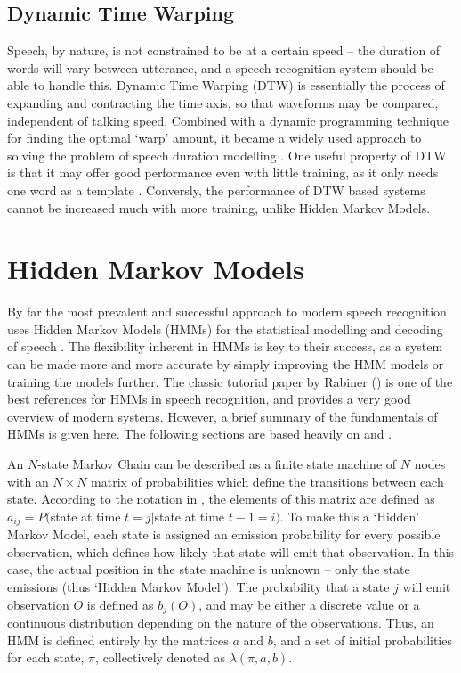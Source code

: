 	\subsection{Dynamic Time Warping} %
		\label{sub:dynamic_time_warping}
		Speech, by nature, is not constrained to be at a certain speed -- the duration of words will vary between utterance, and a speech recognition system should be able to handle this.  Dynamic Time Warping (DTW) is essentially the process of expanding and contracting the time axis, so that waveforms may be compared, independent of talking speed.  Combined with a dynamic programming technique for finding the optimal `warp' amount, it became a widely used approach to solving the problem of speech duration modelling \cite{furui1989speech}.  One useful property of DTW is that it may offer good performance even with little training, as it only needs one word as a template \cite{melnikoff2003speech}.  Conversly, the performance of DTW based systems cannot be increased much with more training, unlike Hidden Markov Models.

\section{Hidden Markov Models} %
\label{sec:about_hmms}
	By far the most prevalent and successful approach to modern speech recognition uses Hidden Markov Models (HMMs) for the statistical modelling and decoding of speech \cite{cox1988hidden}.  The flexibility inherent in HMMs is key to their success, as a system can be made more and more accurate by simply improving the HMM models or training the models further.  The classic tutorial paper by Rabiner (\cite{rabiner1989tutorial}) is one of the best references for HMMs in speech recognition, and provides a very good overview of modern systems.  However, a brief summary of the fundamentals of HMMs is given here. The following sections are based heavily on \cite{rabiner1989tutorial} and \cite{htkbook}.

	An $N$-state Markov Chain can be described as a finite state machine of $N$ nodes with an $N{\times}N$ matrix of probabilities which define the transitions between each state.  According to the notation in \cite{rabiner1989tutorial}, the elements of this matrix are defined as $a_{ij} = P($state at time $t = j |$state at time $t-1 = i)$.  To make this a `Hidden' Markov Model, each state is assigned an emission probability for every possible observation, which defines how likely that state will emit that observation.  In this case, the actual position in the state machine is unknown -- only the state emissions (thus `Hidden Markov Model').  The probability that a state $j$ will emit observation $O$ is defined as $b_j(O)$, and may be either a discrete value or a continuous distribution depending on the nature of the observations.  Thus, an HMM is defined entirely by the matrices $a$ and $b$, and a set of initial probabilities for each state, $\pi$, collectively denoted as $\lambda(\pi,a,b)$.

